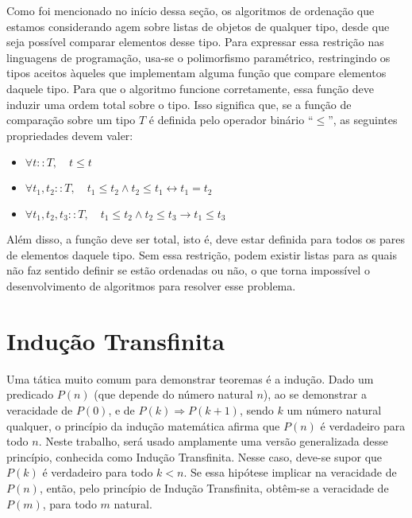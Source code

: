 \documentclass[12pt, oneside, a4paper,english,brazil]{abntex2}
\begin{document}
\qquad Como foi mencionado no in\'icio dessa se\c{c}\~ao, os algoritmos de ordena\c{c}\~ao que estamos
considerando agem sobre listas de objetos de qualquer tipo, desde que seja poss\'ivel comparar elementos
desse tipo. Para expressar essa restri\c{c}\~ao nas linguagens de programa\c{c}\~ao, usa-se o polimorfismo
param\'etrico, restringindo os tipos aceitos \`aqueles que implementam alguma fun\c{c}\~ao que compare
elementos daquele tipo. Para que o algoritmo funcione corretamente, essa fun\c{c}\~ao deve induzir uma ordem
total sobre o tipo. Isso significa que, se a fun\c{c}\~ao de compara\c{c}\~ao sobre um tipo $T$ \'e definida
pelo operador bin\'ario ``$\le$'', as seguintes propriedades devem valer:

\begin{itemize}
  \item $\forall t :: T, \quad t \le t$
  \item $\forall t_{1}, t_{2} :: T, \quad t_{1} \le t_{2} \wedge t_{2} \le t_{1} \leftrightarrow t_{1} = t_{2}$
  \item $\forall t_{1}, t_{2}, t_{3} :: T, \quad t_{1} \le t_{2} \wedge t_{2} \le t_{3} \rightarrow t_{1} \le t_{3}$
\end{itemize}

\qquad Al\'em disso, a fun\c{c}\~ao deve ser total, isto \'e, deve estar definida para todos os pares de
elementos daquele tipo. Sem essa restri\c{c}\~ao, podem existir listas para as quais n\~ao faz sentido
definir se est\~ao ordenadas ou n\~ao, o que torna imposs\'ivel o desenvolvimento de algoritmos para resolver
esse problema.

\section{Indu\c{c}\~ao Transfinita}

\qquad Uma t\'atica muito comum para demonstrar teoremas \'e a indu\c{c}\~ao. Dado um predicado $P(n)$ (que
depende do n\'umero natural $n$), ao se demonstrar a veracidade de $P(0)$, e de $P(k) \Rightarrow P(k + 1)$,
sendo $k$ um n\'umero natural qualquer, o princ\'ipio da indu\c{c}\~ao matem\'atica afirma que $P(n)$ \'e
verdadeiro para todo $n$. Neste trabalho, ser\'a usado amplamente uma vers\~ao generalizada desse
princ\'ipio, conhecida como Indu\c{c}\~ao Transfinita. Nesse caso, deve-se supor que $P(k)$ \'e verdadeiro
para todo $k < n$. Se essa hip\'otese implicar na veracidade de $P(n)$, ent\~ao, pelo princ\'ipio de
Indu\c{c}\~ao Transfinita, obt\^em-se a veracidade de $P(m)$, para todo $m$ natural.
\end{document}
